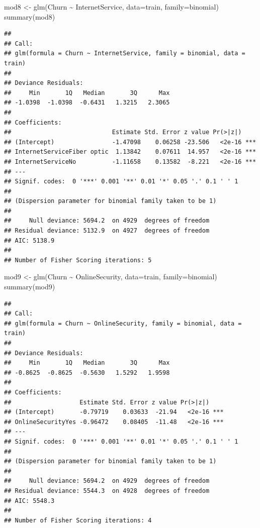 \documentclass[
  twoside]{article}
\newenvironment{Shaded}{\begin{snugshade}}{\end{snugshade}}
\newcommand{\AttributeTok}[1]{\textcolor[rgb]{0.77,0.63,0.00}{#1}}
\newcommand{\FunctionTok}[1]{\textcolor[rgb]{0.00,0.00,0.00}{#1}}
\newcommand{\NormalTok}[1]{#1}
\newcommand{\OtherTok}[1]{\textcolor[rgb]{0.56,0.35,0.01}{#1}}
\newcommand{\SpecialCharTok}[1]{\textcolor[rgb]{0.00,0.00,0.00}{#1}}
\begin{document}
\begin{Shaded}
\begin{Highlighting}[]
\NormalTok{mod8 }\OtherTok{\textless{}{-}} \FunctionTok{glm}\NormalTok{(Churn }\SpecialCharTok{\textasciitilde{}}\NormalTok{ InternetService, }\AttributeTok{data=}\NormalTok{train, }\AttributeTok{family=}\NormalTok{binomial)}
\FunctionTok{summary}\NormalTok{(mod8)}
\end{Highlighting}
\end{Shaded}

\begin{verbatim}
## 
## Call:
## glm(formula = Churn ~ InternetService, family = binomial, data = train)
## 
## Deviance Residuals: 
##     Min       1Q   Median       3Q      Max  
## -1.0398  -1.0398  -0.6431   1.3215   2.3065  
## 
## Coefficients:
##                            Estimate Std. Error z value Pr(>|z|)    
## (Intercept)                -1.47098    0.06258 -23.506   <2e-16 ***
## InternetServiceFiber optic  1.13842    0.07611  14.957   <2e-16 ***
## InternetServiceNo          -1.11658    0.13582  -8.221   <2e-16 ***
## ---
## Signif. codes:  0 '***' 0.001 '**' 0.01 '*' 0.05 '.' 0.1 ' ' 1
## 
## (Dispersion parameter for binomial family taken to be 1)
## 
##     Null deviance: 5694.2  on 4929  degrees of freedom
## Residual deviance: 5132.9  on 4927  degrees of freedom
## AIC: 5138.9
## 
## Number of Fisher Scoring iterations: 5
\end{verbatim}

\begin{Shaded}
\begin{Highlighting}[]
\NormalTok{mod9 }\OtherTok{\textless{}{-}} \FunctionTok{glm}\NormalTok{(Churn }\SpecialCharTok{\textasciitilde{}}\NormalTok{ OnlineSecurity, }\AttributeTok{data=}\NormalTok{train, }\AttributeTok{family=}\NormalTok{binomial)}
\FunctionTok{summary}\NormalTok{(mod9)}
\end{Highlighting}
\end{Shaded}

\begin{verbatim}
## 
## Call:
## glm(formula = Churn ~ OnlineSecurity, family = binomial, data = train)
## 
## Deviance Residuals: 
##     Min       1Q   Median       3Q      Max  
## -0.8625  -0.8625  -0.5630   1.5292   1.9598  
## 
## Coefficients:
##                   Estimate Std. Error z value Pr(>|z|)    
## (Intercept)       -0.79719    0.03633  -21.94   <2e-16 ***
## OnlineSecurityYes -0.96472    0.08405  -11.48   <2e-16 ***
## ---
## Signif. codes:  0 '***' 0.001 '**' 0.01 '*' 0.05 '.' 0.1 ' ' 1
## 
## (Dispersion parameter for binomial family taken to be 1)
## 
##     Null deviance: 5694.2  on 4929  degrees of freedom
## Residual deviance: 5544.3  on 4928  degrees of freedom
## AIC: 5548.3
## 
## Number of Fisher Scoring iterations: 4
\end{verbatim}
\end{document}
